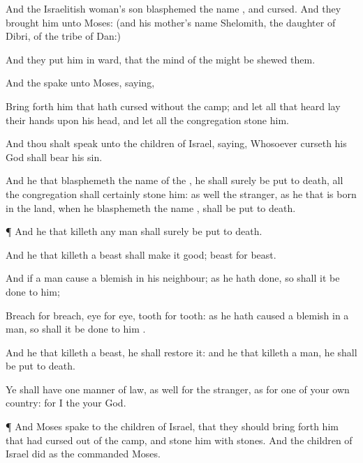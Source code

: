 {And the
Israelitish
woman’s
son
blasphemed the
name
{}, and
cursed. And they
brought him unto
Moses: (and his
mother’s
name
{}
Shelomith, the
daughter of
Dibri, of the
tribe of
Dan:)

And they
put him in
ward, that the
mind of the
{} might be
shewed them.

And the
{}
spake unto
Moses,
saying,

Bring
forth him that hath
cursed
without the
camp; and let all that
heard
{}
lay their
hands upon his
head, and let all the
congregation
stone him.

And thou shalt
speak unto the
children of
Israel,
saying,
Whosoever
curseth his
God shall
bear his
sin.

And he that
blasphemeth the
name of the
{}, he shall
surely be put to
death,
{} all the
congregation shall
certainly
stone him: as well the
stranger, as he that is born in the
land, when he
blasphemeth the
name
{}, shall be put to
death.


\par }{\PP {}¶ And
he that
killeth
any
man shall
surely be put to
death.

And he that
killeth a
beast shall make it
good;
beast for
beast.

And if a
man
cause a
blemish in his
neighbour; as he hath
done, so shall it be
done to him;

Breach for
breach,
eye for
eye,
tooth for
tooth: as he hath
caused a
blemish in a
man, so shall it be
done to him
{}.

And he that
killeth a
beast, he shall
restore it: and he that
killeth a
man, he shall be put to
death.

Ye shall have
one manner of
law, as well for the
stranger, as for one of your own
country: for I
{} the
{} your
God.


\par }{\PP {}¶ And
Moses
spake to the
children of
Israel, that they should bring
forth him that had
cursed
out of the
camp, and
stone him with
stones. And the
children of
Israel
did as the
{}
commanded
Moses.




}
